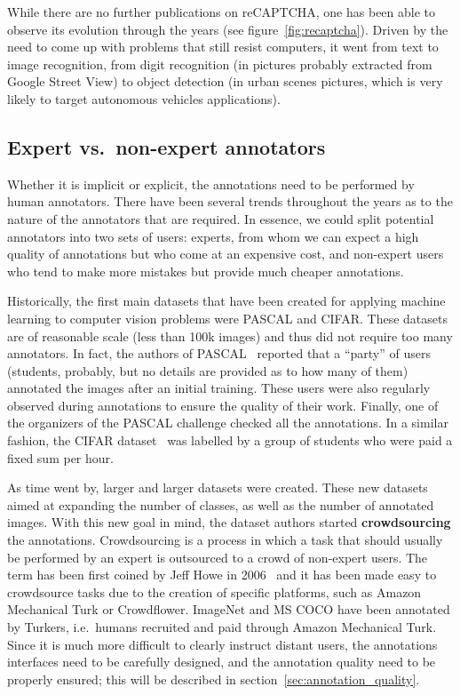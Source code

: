 While there are no further publications on reCAPTCHA,
one has been able to observe its evolution through the years (see figure~\ref{fig:recaptcha}).
Driven by the need to come up with problems that still resist computers,
it went from text to image recognition, from digit recognition
(in pictures probably extracted from Google Street View) to object detection
(in urban scenes pictures, which is very likely to target autonomous vehicles applications).

\subsection{Expert vs.\ non-expert annotators}

Whether it is implicit or explicit,
the annotations need to be performed by human annotators.
There have been several trends throughout the years
as to the nature of the annotators that are required.
In essence, we could split potential annotators into two sets of users:
experts, from whom we can expect a high quality of annotations
but who come at an expensive cost, and non-expert users
who tend to make more mistakes but provide much cheaper annotations.

Historically, the first main datasets that have been created
for applying machine learning to computer vision problems were PASCAL and CIFAR.\@
These datasets are of reasonable scale (less than 100k images)
and thus did not require too many annotators.
In fact, the authors of PASCAL~\cite{Everingham10} reported that a ``party'' of users
(students, probably, but no details are provided as to how many of them)
annotated the images after an initial training.
These users were also regularly observed during annotations
to ensure the quality of their work.
Finally, one of the organizers of the PASCAL challenge checked all the annotations.
In a similar fashion, the CIFAR dataset~\cite{krizhevsky2009learning}
was labelled by a group of students who were paid a fixed sum per hour.

As time went by, larger and larger datasets were created.
These new datasets aimed at expanding the number of classes,
as well as the number of annotated images.
With this new goal in mind,
the dataset authors started \textbf{crowdsourcing} the annotations.
Crowdsourcing is a process in which a task that should usually be performed
by an expert is outsourced to a crowd of non-expert users.
The term has been first coined by Jeff Howe in 2006~\cite{howe2006rise}
and it has been made easy to crowdsource tasks
due to the creation of specific platforms,
such as Amazon Mechanical Turk or Crowdflower.
ImageNet and MS COCO have been annotated by Turkers,
i.e.\ humans recruited and paid through Amazon Mechanical Turk.
Since it is much more difficult to clearly instruct distant users,
the annotations interfaces need to be carefully designed,
and the annotation quality need to be properly ensured;
this will be described in section~\ref{sec:annotation_quality}.

